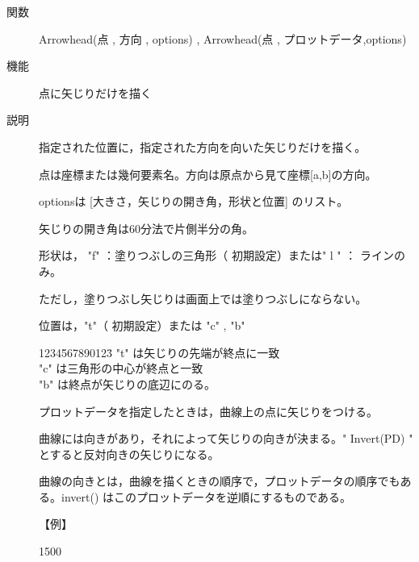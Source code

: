 \documentclass[papersize,a4paper,12pt,uplatex]{jsarticle}
\begin{document}
\begin{description}
\vspace{\baselineskip}
\hypertarget{arrowhead}{}
\item[関数]Arrowhead(点 , 方向 , options) , Arrowhead(点 , プロットデータ,options)
\item[機能]点に矢じりだけを描く
\item[説明]指定された位置に，指定された方向を向いた矢じりだけを描く。

点は座標または幾何要素名。方向は原点から見て座標[a,b]の方向。

optionsは [大きさ，矢じりの開き角，形状と位置] のリスト。

矢じりの開き角は60分法で片側半分の角。

形状は， "f" ：塗りつぶしの三角形（ 初期設定）または" l " ： ラインのみ。

ただし，塗りつぶし矢じりは画面上では塗りつぶしにならない。 

位置は，"t"（ 初期設定）または "c" , "b"
\begin{tabbing}
1234\=567890123\=\kill
\>"t" は矢じりの先端が終点に一致\\
\>"c" は三角形の中心が終点と一致\\
\>"b" は終点が矢じりの底辺にのる。
\end{tabbing}
プロットデータを指定したときは，曲線上の点に矢じりをつける。

曲線には向きがあり，それによって矢じりの向きが決まる。" Invert(PD) " とすると反対向きの矢じりになる。

曲線の向きとは，曲線を描くときの順序で，プロットデータの順序でもある。invert() はこのプロットデータを逆順にするものである。

\vspace{\baselineskip}

【例】

\vspace{\baselineskip}
\begin{layer}{150}{0}
\end{layer}


\end{description}
\end{document}
